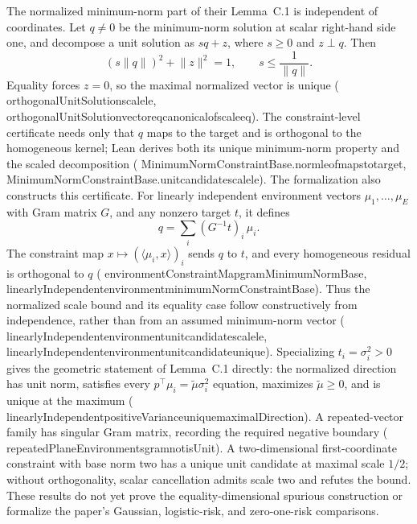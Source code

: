 \documentclass[11pt]{article}
\newcommand{\leanname}[1]{{\scriptsize\ttfamily
  \def\_{\textunderscore\allowbreak}#1}}
\begin{document}
The normalized minimum-norm part of their Lemma~C.1 is independent of
coordinates.  Let $q\ne0$ be the minimum-norm solution at scalar right-hand
side one, and decompose a unit solution as $s q+z$, where $s\ge0$ and
$z\perp q$.  Then
\[
  (s\lVert q\rVert)^2+\lVert z\rVert^2=1,
  \qquad
  s\le\frac{1}{\lVert q\rVert}.
\]
Equality forces $z=0$, so the maximal normalized vector is unique
(\leanname{orthogonalUnitSolution\_scale\_le},
\leanname{orthogonalUnitSolution\_vector\_eq\_canonical\_of\_scale\_eq}).
The constraint-level certificate needs only that $q$ maps to the target and
is orthogonal to the homogeneous kernel; Lean derives both its unique
minimum-norm property and the scaled decomposition
(\leanname{MinimumNormConstraintBase.norm\_le\_of\_maps\_to\_target},
\leanname{MinimumNormConstraintBase.unit\_candidate\_scale\_le}).
The formalization also constructs this certificate.  For linearly independent
environment vectors $\mu_1,\ldots,\mu_E$ with Gram matrix $G$, and any
nonzero target $t$, it defines
\[
  q=\sum_i (G^{-1}t)_i\,\mu_i .
\]
The constraint map $x\mapsto(\langle\mu_i,x\rangle)_i$ sends $q$ to $t$,
and every homogeneous residual is orthogonal to $q$
(\leanname{environmentConstraintMap\_gramMinimumNormBase},
\leanname{linearlyIndependent\_environment\_minimumNormConstraintBase}).
Thus the normalized scale bound and its equality case follow constructively
from independence, rather than from an assumed minimum-norm vector
(\leanname{linearlyIndependent\_environment\_unit\_candidate\_scale\_le},
\leanname{linearlyIndependent\_environment\_unit\_candidate\_unique}).
Specializing $t_i=\sigma_i^2>0$ gives the geometric statement of
Lemma~C.1 directly: the normalized direction has unit norm, satisfies every
$p^\top\mu_i=\widetilde{\mu}\sigma_i^2$ equation, maximizes
$\widetilde{\mu}\ge0$, and is unique at the maximum
(\leanname{linearlyIndependent\_positiveVariance\_unique\_maximalDirection}).
A repeated-vector family has singular Gram matrix, recording the required
negative boundary
(\leanname{repeatedPlaneEnvironments\_gram\_not\_isUnit}).
A two-dimensional first-coordinate constraint with base norm two has a
unique unit candidate at maximal scale $1/2$; without orthogonality, scalar
cancellation admits scale two and refutes the bound.
These results do not yet prove the equality-dimensional spurious
construction or formalize the paper's Gaussian, logistic-risk, and
zero-one-risk comparisons.
\end{document}
